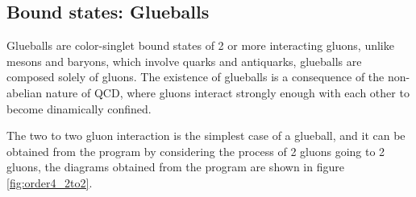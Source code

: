 \documentclass[11pt,a4paper,twoside,pdf]{article}
\numberwithin{equation}{section}
\begin{document}
\newpage

\subsection{Bound states: Glueballs}

Glueballs are color-singlet bound states of 2 or more interacting gluons, unlike mesons
and baryons, which involve quarks and antiquarks, glueballs are composed solely of gluons.
The existence of glueballs is a consequence of the non-abelian nature of QCD, where gluons
interact strongly enough with each other to become dinamically confined.

The two to two gluon interaction is the simplest case of a glueball, and it can be
obtained from the program by considering the process of 2 gluons going to 2 gluons, 
the diagrams obtained from the program are shown in figure \ref{fig:order4_2to2}.
\end{document}
